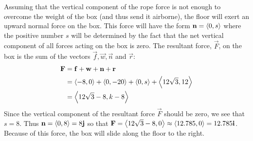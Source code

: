 \documentclass[handout]{ximera}
\begin{document}
\begin{example}[Example 6]
Assuming that the vertical component of the rope force is not enough to overcome the weight of the box (and thus send it airborne), 
the floor will exert an upward normal force on the box.  This force will have the form $\mathbf{n} = \left\langle 0, s\right\rangle$ where the positive 
number $s$ will be determined by the fact that the net vertical component of all forces acting on the box is zero. 
The resultant force, $\vec{F}$, on the box is the sum of the vectors $\vec{f}, \vec{w}, \vec{n}$ and $\vec{r}$:
\begin{align*}
\mathbf{F} &= \mathbf{f} + \mathbf{w} + \mathbf{n} +  \mathbf{r} \\
         &= \left\langle -8,0\right\rangle + \left\langle 0,-20\right\rangle +\left\langle 0,s\right\rangle + \left\langle 12\sqrt 3, 12\right\rangle \\
         &= \left\langle 12\sqrt 3 -8 , k-8\right\rangle
\end{align*}
Since the vertical component of the resultant force $\vec{F}$ should be zero, we see that $s = 8$. 
Thus $\mathbf{n} = \left\langle 0,8\right\rangle = 8\mathbf{j}$ so that $\mathbf{F} = \left\langle 12\sqrt 3 -8, 0\right\rangle \approx \left\langle 12.785,0\right\rangle = 12.785\mathbf{i}$. Because of this force, 
the box will slide along the floor to the right.





\end{example}
\end{document}
